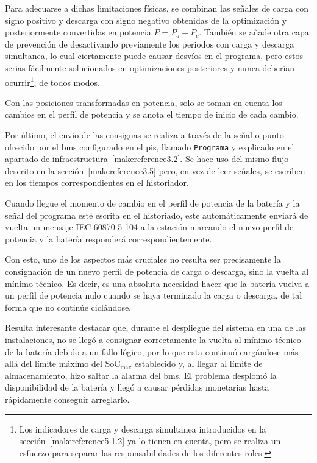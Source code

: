 Para adecuarse a dichas limitaciones físicas, se combinan las señales de carga con signo positivo y descarga con signo negativo obtenidas de la optimización y posteriormente convertidas en potencia \( P = P_{d} - P_{c} \). También se añade otra capa de prevención de desactivando previamente los periodos con carga y descarga simultanea, lo cual ciertamente puede causar desvíos en el programa, pero estos serias fácilmente solucionados en optimizaciones posteriores y nunca deberían ocurrir\footnote{Los indicadores de carga y descarga simultanea introducidos en la sección~\ref{makereference5.1.2} ya lo tienen en cuenta, pero se realiza un esfuerzo para separar las responsabilidades de los diferentes roles.}, de todos modos.

Con las posiciones transformadas en potencia, solo se toman en cuenta los cambios en el perfil de potencia y se anota el tiempo de inicio de cada cambio.

Por último, el envio de las consignas se realiza a través de la señal o punto ofrecido por el \gls{bms} configurado en el \gls{pis}, llamado \texttt{Programa} y explicado en el apartado de infraestructura~\ref{makereference3.2}. Se hace uso del mismo flujo descrito en la sección~\ref{makereference3.5} pero, en vez de leer señales, se escriben en los tiempos correspondientes en el historiador.

Cuando llegue el momento de cambio en el perfil de potencia de la batería y la señal del programa esté escrita en el historiado, este automáticamente enviará de vuelta un mensaje IEC 60870-5-104 a la estación marcando el nuevo perfil de potencia y la batería responderá correspondientemente.

Con esto, uno de los aspectos más cruciales no resulta ser precisamente la consignación de un nuevo perfil de potencia de carga o descarga, sino la vuelta al mínimo técnico. Es decir, es una absoluta necesidad hacer que la batería vuelva a un perfil de potencia nulo cuando se haya terminado la carga o descarga, de tal forma que no continúe ciclándose.

Resulta interesante destacar que, durante el despliegue del sistema en una de las instalaciones, no se llegó a consignar correctamente la vuelta al mínimo técnico de la batería debido a un fallo lógico, por lo que esta continuó cargándose más allá del límite máximo del \( \mathrm{SoC}_{\text{max}} \) establecido y, al llegar al límite de almacenamiento, hizo saltar la alarma del \gls{bms}. El problema desplomó la disponibilidad de la batería y llegó a causar pérdidas monetarias hasta rápidamente conseguir arreglarlo.

